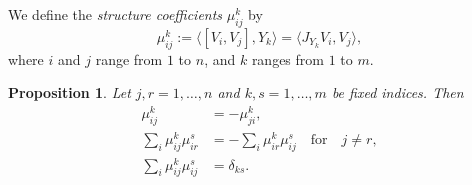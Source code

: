 \documentclass{amsart}
\theoremstyle{plain}
\newtheorem{proposition}[theorem]{Proposition}
\theoremstyle{definition}
\theoremstyle{remark}
\begin{document}
 	We define the \emph{structure coefficients} $\mu_{ij}^k$ by 
 	$$\mu_{ij}^k := \langle [V_i,V_j], Y_k \rangle = \langle J_{Y_k}V_i, V_j \rangle,$$
 	where $i$ and $j$ range from $1$ to $n$, and $k$ ranges from $1$ to $m$.
 	
 	\begin{proposition}
 		\label{structure coefficients}
 		Let $j,r = 1,\ldots,n$ and $k,s= 1,\ldots,m$ be fixed indices. Then
 		\begin{align}
 			\mu_{ij}^k &= -\mu_{ji}^k, \label{bad1}\\
 			\sum_i \mu_{ij}^k \mu_{ir}^s &= - \sum_i \mu_{ir}^k \mu_{ij}^s \quad \text{for} \quad j \neq r,\label{bad2} \\
 			\sum_i \mu_{ij}^k \mu_{ij}^s &= \delta_{ks}. \label{bad3}
 		\end{align}
 	\end{proposition}
\end{document}
